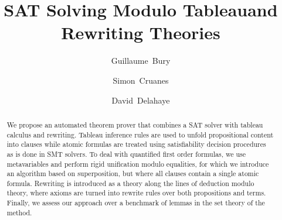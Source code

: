 \documentclass[orivec]{llncs}
\begin{document}
\title{SAT Solving Modulo Tableau\break{}and Rewriting Theories}

\author{Guillaume~Bury \and Simon~Cruanes \and
David~Delahaye}


\maketitle

\begin{abstract}
We propose an automated theorem prover that combines a SAT solver with tableau
calculus and rewriting. Tableau inference rules are used to unfold propositional
content into clauses while atomic formulas are treated using satisfiability
decision procedures as is done in SMT solvers. To deal with quantified first
order formulas, we use metavariables and perform rigid unification modulo
equalities, for which we introduce an algorithm based on superposition, but
where all clauses contain a single atomic formula. Rewriting is introduced as a
theory along the lines of deduction modulo theory, where axioms are turned into
rewrite rules over both propositions and terms.  Finally, we assess our approach
over a benchmark of lemmas in the set theory of the \bmth{} method.

\end{abstract}










\end{document}

